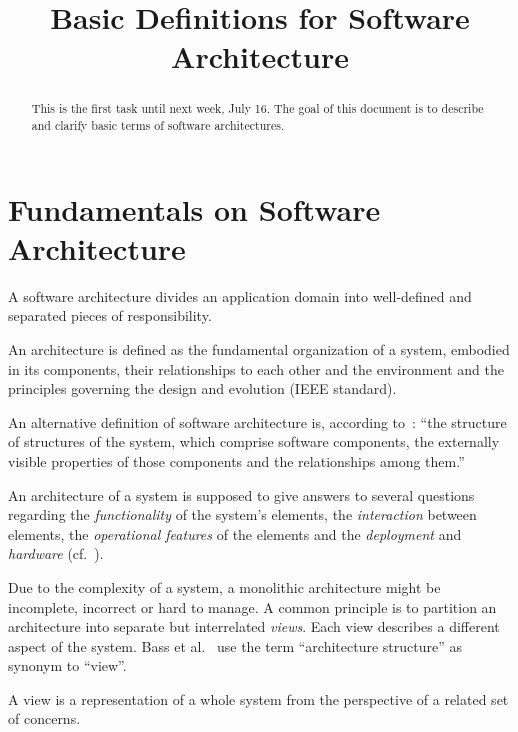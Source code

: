 \documentclass{llncs} %
\begin{document}
\title{Basic Definitions for Software Architecture}
 

\maketitle

\begin{abstract}
This is the first task until next week, July 16.
The goal of this document is to describe and clarify basic terms of software architectures.

\end{abstract}

\section{Fundamentals on Software Architecture}


A software architecture divides an application domain into well-defined and separated pieces of
responsibility.

\begin{definition}[Architecture]
An architecture is defined as the fundamental organization of a system,
embodied in its components, their relationships to each other and
the environment and the principles governing the design and
evolution (IEEE standard).
\end{definition}

An alternative definition of software architecture is, according to~\cite{Buschmann1998POS}:
``the structure of structures of the system, which comprise
software components, the externally visible properties of those components and the relationships
among them.''

An architecture of a system is supposed to give answers to several questions
regarding the \emph{functionality} of the system's elements,
the \emph{interaction} between elements,
the \emph{operational features} of the elements and
the \emph{deployment} and \emph{hardware} (cf.~\cite{Rozanski2005SSA}).

Due to the complexity of a system, a monolithic architecture might
be incomplete, incorrect or hard to manage.
A common principle is to partition an architecture into separate
but interrelated \emph{views}.
Each view describes a different aspect of the system.  
Bass et al.~\cite{Bass1998SAI} use the term ``architecture structure'' as synonym to ``view''.

\begin{definition}[View]
A view is a representation of a whole system from the perspective of a related set of concerns.
\end{definition}
\end{document}
